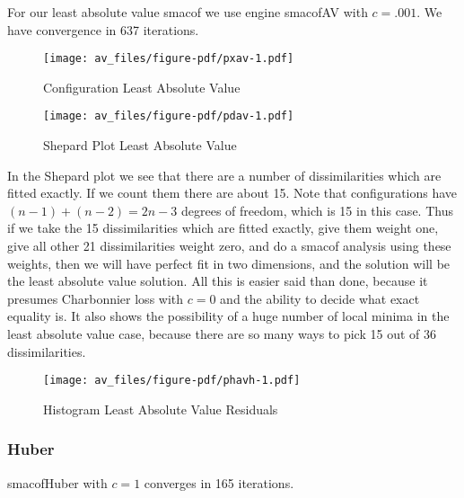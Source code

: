 \documentclass[
  12pt,
  letterpaper,
  DIV=11,
  numbers=noendperiod]{scrartcl}
\theoremstyle{plain}
\theoremstyle{remark}
\begin{document}
For our least absolute value smacof we use engine smacofAV with
\(c=.001\). We have convergence in 637 iterations.

\begin{figure}[H]

{\centering \texttt{[image: av\_files/figure-pdf/pxav-1.pdf]}

}

\caption{Configuration Least Absolute Value}

\end{figure}%

\begin{figure}[H]

{\centering \texttt{[image: av\_files/figure-pdf/pdav-1.pdf]}

}

\caption{Shepard Plot Least Absolute Value}

\end{figure}%

In the Shepard plot we see that there are a number of dissimilarities
which are fitted exactly. If we count them there are about 15. Note that
configurations have \((n-1)+(n-2)=2n-3\) degrees of freedom, which is 15
in this case. Thus if we take the 15 dissimilarities which are fitted
exactly, give them weight one, give all other 21 dissimilarities weight
zero, and do a smacof analysis using these weights, then we will have
perfect fit in two dimensions, and the solution will be the least
absolute value solution. All this is easier said than done, because it
presumes Charbonnier loss with \(c=0\) and the ability to decide what
exact equality is. It also shows the possibility of a huge number of
local minima in the least absolute value case, because there are so many
ways to pick 15 out of 36 dissimilarities.

\begin{figure}[H]

{\centering \texttt{[image: av\_files/figure-pdf/phavh-1.pdf]}

}

\caption{Histogram Least Absolute Value Residuals}

\end{figure}%

\subsubsection{Huber}\label{huber-1}

smacofHuber with \(c=1\) converges in 165 iterations.
\end{document}
